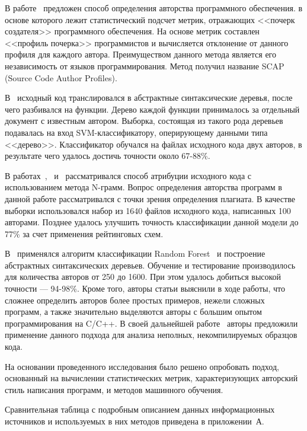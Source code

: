 В работе~\cite{frantz_2} предложен способ определения авторства программного обеспечения. в основе которого 
лежит статистический подсчет метрик, отражающих <<почерк создателя>> программного обеспечения. 
На основе метрик составлен <<профиль почерка>> программистов и вычисляется отклонение от данного профиля для 
каждого автора. Преимуществом данного метода является его независимость от языков программирования. Метод 
получил название SCAP (Source Code Author Profiles).

В~\cite{pellin} исходный код транслировался в абстрактные синтаксические деревья, 
после чего разбивался на функции. Дерево каждой функции принималось за отдельный документ с известным автором. 
Выборка, состоящая из такого рода деревьев подавалась на вход SVM-классификатору, 
оперирующему данными типа <<дерево>>. Классификатор обучался на файлах исходного кода двух авторов, в результате чего удалось достичь точности около 67-88\%.

В работах~\cite{burrows},~\cite{burrows_big} и~\cite{burrows_3} рассматривался способ атрибуции исходного кода с использованием метода N-грамм. 
Вопрос определения авторства программ в данной работе рассматривался с точки зрения определения плагиата. 
В качестве выборки использовался набор из 1640 файлов исходного кода, написанных 100 авторами. Позднее 
удалось улучшить точность классификации данной модели до 77\% за счет применения рейтинговых схем.

В~\cite{caliskan} применялся алгоритм классификации Random Forest~\cite{random_forest} и построение 
абстрактных синтаксических деревьев. Обучение и тестирование производилось для 
количества авторов от 250 до 1600. При этом удалось добиться высокой точности --- 94-98\%. 
Кроме того, авторы статьи выяснили в ходе работы, что сложнее определить авторов более простых примеров, 
нежели сложных программ, а также значительно выделяются авторы с большим опытом программирования на C/C++. 
В своей дальнейшей работе~\cite{git_blame} авторы предложили применение данного подхода для анализа неполных, 
некомпилируемых образцов кода. 

На основании проведенного исследования было решено опробовать подход, основанный на вычислении 
статистических метрик, характеризующих авторский стиль написания программ, и методов машинного обучения. 

Сравнительная таблица с подробным описанием данных информационных источников и используемых в них методов 
приведена в приложении~А.





